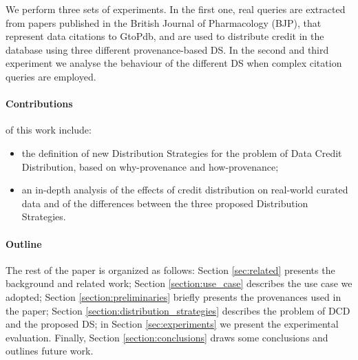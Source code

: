We perform three sets of experiments. In the first one, real queries are extracted from papers published in the British Journal of Pharmacology (BJP), that represent data citations to GtoPdb, and are used to distribute credit in the database using three different provenance-based DS. 
In the second and third experiment we analyse the behaviour of the different DS when  complex citation queries are employed.


\paragraph{\textbf{Contributions}}of this work include:
\begin{itemize}
    \item the definition of new Distribution Strategies for the problem of Data Credit Distribution, based on why-provenance and how-provenance;
    \item an in-depth analysis of the effects of credit distribution on real-world curated data and of the differences between the three proposed Distribution Strategies.
\end{itemize}

\paragraph{\textbf{Outline}} The rest of the paper is organized as follows:
Section \ref{sec:related} presents the background and related work; Section \ref{section:use_case} describes the use case we adopted; Section \ref{section:preliminaries} briefly presents the provenances used in the paper; Section \ref{section:distribution_strategies} describes the problem of DCD and the proposed DS; in Section \ref{sec:experiments} we present the experimental evaluation. Finally, Section \ref{section:conclusions} draws some conclusions and outlines future work.



 
